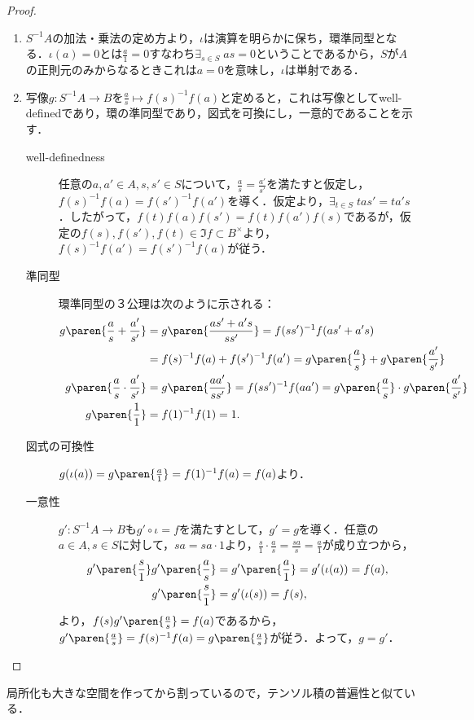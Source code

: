 \documentclass[uplatex,dvipdfmx]{jsreport}
\begin{document}
\begin{proof}\mbox{}
    \begin{enumerate}
        \item $S^{-1}A$の加法・乗法の定め方より，$\iota$は演算を明らかに保ち，環準同型となる．$\iota(a)=0$とは$\frac{a}{1}=0$すなわち$\exists_{s\in S}\;as=0$ということであるから，$S$が$A$の正則元のみからなるときこれは$a=0$を意味し，$\iota$は単射である．
        \item 写像$g:S^{-1}A\to B$を$\frac{a}{s}\mapsto f(s)^{-1}f(a)$と定めると，これは写像としてwell-definedであり，環の準同型であり，図式を可換にし，一意的であることを示す．
        \begin{description}
            \item[well-definedness] 任意の$a,a'\in A,s,s'\in S$について，$\frac{a}{s}=\frac{a'}{s'}$を満たすと仮定し，$f(s)^{-1}f(a)=f(s')^{-1}f(a')$を導く．仮定より，$\exists_{t\in S}\;tas'=ta's$．したがって，$f(t)f(a)f(s')=f(t)f(a')f(s)$であるが，仮定の$f(s),f(s'),f(t)\in\Im f\subset B^\times$より，$f(s)^{-1}f(a')=f(s')^{-1}f(a)$が従う．
            \item[準同型] 環準同型の３公理は次のように示される： \begin{align*}
                g\paren{\frac{a}{s}+\frac{a'}{s'}}&=g\paren{\frac{as'+a's}{ss'}}=f(ss')^{-1}f(as'+a's)\\
                &=f(s)^{-1}f(a)+f(s')^{-1}f(a')=g\paren{\frac{a}{s}}+g\paren{\frac{a'}{s'}}\\
                g\paren{\frac{a}{s}\cdot\frac{a'}{s'}}&=g\paren{\frac{aa'}{ss'}}=f(ss')^{-1}f(aa')=g\paren{\frac{a}{s}}\cdot g\paren{\frac{a'}{s'}}\\
                g\paren{\frac{1}{1}}&=f(1)^{-1}f(1)=1.
            \end{align*}
            \item[図式の可換性]
            $g(\iota(a))=g\paren{\frac{a}{1}}=f(1)^{-1}f(a)=f(a)$より．
            \item[一意性]
            $g':S^{-1}A\to B$も$g'\circ\iota=f$を満たすとして，$g'=g$を導く．任意の$a\in A,s\in S$に対して，$sa=sa\cdot 1$より，$\frac{s}{1}\cdot\frac{a}{s}=\frac{sa}{s}=\frac{a}{1}$が成り立つから，
            \begin{align*}
                g'\paren{\frac{s}{1}}g'\paren{\frac{a}{s}}&=g'\paren{\frac{a}{1}}=g'(\iota(a))=f(a),\\
                g'\paren{\frac{s}{1}}&=g'(\iota(s))=f(s),
            \end{align*}
            より，$f(s)g'\paren{\frac{a}{s}}=f(a)$であるから，$g'\paren{\frac{a}{s}}=f(s)^{-1}f(a)=g\paren{\frac{a}{s}}$が従う．よって，$g=g'$．
        \end{description}
    \end{enumerate}
\end{proof}
\begin{remarks}
    局所化も大きな空間を作ってから割っているので，テンソル積の普遍性と似ている．
\end{remarks}
\end{document}
